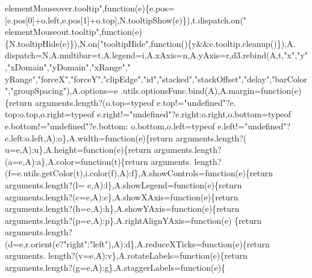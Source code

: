 \begin{DoxyCode}
{      elementMouseover.tooltip"},\textcolor{keyword}{function}(e)\{e.pos=[e.pos[0]+o.left,e.pos[1]+o.top],N.tooltipShow(e)\}),t.dispatch.on(\textcolor{stringliteral}{"
      elementMouseout.tooltip"},\textcolor{keyword}{function}(e)\{N.tooltipHide(e)\}),N.on(\textcolor{stringliteral}{"tooltipHide"},\textcolor{keyword}{function}()\{y&&e.tooltip.cleanup()\}),A.
      dispatch=N,A.multibar=t,A.legend=i,A.xAxis=n,A.yAxis=r,d3.rebind(A,t,\textcolor{stringliteral}{"x"},\textcolor{stringliteral}{"y"},\textcolor{stringliteral}{"xDomain"},\textcolor{stringliteral}{"yDomain"},\textcolor{stringliteral}{"xRange"},\textcolor{stringliteral}{"
      yRange"},\textcolor{stringliteral}{"forceX"},\textcolor{stringliteral}{"forceY"},\textcolor{stringliteral}{"clipEdge"},\textcolor{stringliteral}{"id"},\textcolor{stringliteral}{"stacked"},\textcolor{stringliteral}{"stackOffset"},\textcolor{stringliteral}{"delay"},\textcolor{stringliteral}{"barColor"},\textcolor{stringliteral}{"groupSpacing"}),A.options=e
      .utils.optionsFunc.bind(A),A.margin=\textcolor{keyword}{function}(e)\{\textcolor{keywordflow}{return} arguments.length?(o.top=typeof e.top!=\textcolor{stringliteral}{"undefined"}?e.
      top:o.top,o.right=typeof e.right!=\textcolor{stringliteral}{"undefined"}?e.right:o.right,o.bottom=typeof e.bottom!=\textcolor{stringliteral}{"undefined"}?e.bottom:
      o.bottom,o.left=typeof e.left!=\textcolor{stringliteral}{"undefined"}?e.left:o.left,A):o\},A.width=\textcolor{keyword}{function}(e)\{\textcolor{keywordflow}{return} arguments.length?(
      u=e,A):u\},A.height=\textcolor{keyword}{function}(e)\{\textcolor{keywordflow}{return} arguments.length?(a=e,A):a\},A.color=\textcolor{keyword}{function}(t)\{\textcolor{keywordflow}{return} arguments.
      length?(f=e.utils.getColor(t),i.color(f),A):f\},A.showControls=\textcolor{keyword}{function}(e)\{\textcolor{keywordflow}{return} arguments.length?(l=
      e,A):l\},A.showLegend=\textcolor{keyword}{function}(e)\{\textcolor{keywordflow}{return} arguments.length?(c=e,A):c\},A.showXAxis=\textcolor{keyword}{function}(e)\{\textcolor{keywordflow}{return} 
      arguments.length?(h=e,A):h\},A.showYAxis=\textcolor{keyword}{function}(e)\{\textcolor{keywordflow}{return} arguments.length?(p=e,A):p\},A.rightAlignYAxis=\textcolor{keyword}{function}(e)
      \{\textcolor{keywordflow}{return} arguments.length?(d=e,r.orient(e?\textcolor{stringliteral}{"right"}:\textcolor{stringliteral}{"left"}),A):d\},A.reduceXTicks=\textcolor{keyword}{function}(e)\{\textcolor{keywordflow}{return} arguments.
      length?(v=e,A):v\},A.rotateLabels=\textcolor{keyword}{function}(e)\{\textcolor{keywordflow}{return} arguments.length?(g=e,A):g\},A.staggerLabels=\textcolor{keyword}{function}(e)\{\textcolor{keywordflow}{
}
\end{DoxyCode}
